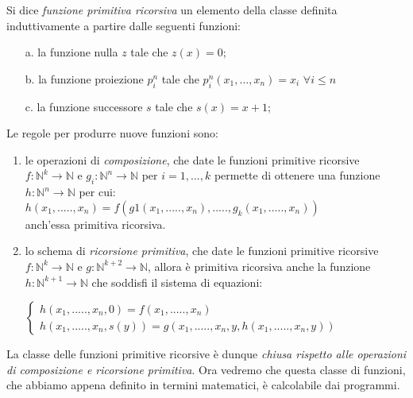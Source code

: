 \begin{programmi}
Si dice \emph{funzione primitiva ricorsiva} un elemento della
classe definita induttivamente a partire dalle seguenti funzioni:
\begin{itemize}
\item [a.] la funzione nulla $z$ tale che $z(x)=0$;
\item [b.] la funzione proiezione $p^n_i$ tale che $p_i^n(x_1,\ldots
  ,x_n)=x_i$ $\forall i\leq n$
\item [c.]la funzione successore $s$ tale che $s(x) = x+1$;
\end{itemize}
\end{programmi}
	
Le regole per produrre nuove funzioni sono:
\begin{enumerate}
\item le operazioni di \emph{\emph{composizione}}, che date le
  funzioni primitive ricorsive $f: \mathbb{N}^k \rightarrow
  \mathbb{N}$ e $g_i : \mathbb{N}^n \rightarrow \mathbb{N}$ per $i= 1,
  ... , k$ permette di ottenere una funzione $h : \mathbb{N}^n
  \rightarrow \mathbb{N}$ per cui:\\ $
  h(x_1,.....,x_n)=f(g1(x_1,.....,x_n),....., g_k (x_1,.....,x_n))$
  \\ anch'essa primitiva ricorsiva.
\item lo schema di \emph{\emph{ricorsione primitiva}}, che date
  le funzioni primitive ricorsive $f: \mathbb{N}^k \rightarrow
  \mathbb{N}$ e $g : \mathbb{N}^{k+2} \rightarrow \mathbb{N}$, allora
  \`e primitiva ricorsiva anche la funzione $h : \mathbb{N}^{k+1}
  \rightarrow \mathbb{N}$ che soddisfi il sistema di equazioni:
\begin{center}
$\left\{ \begin{array}{ll} h(x_1,.....,x_n,0)= f(x_1,.....,x_n)
    \\ h(x_1,.....,x_n,s(y))=g(x_1,.....,x_n, y, h(x_1,.....,x_n,y))
				\end{array} \right.$
\end{center}
\end{enumerate}
\vspace{5mm}%
	
La classe delle funzioni primitive ricorsive \`e dunque \emph{chiusa
  rispetto alle operazioni di composizione e ricorsione
  primitiva}. Ora vedremo che questa classe di funzioni, che abbiamo
appena definito in termini matematici, \`e calcolabile dai programmi.


